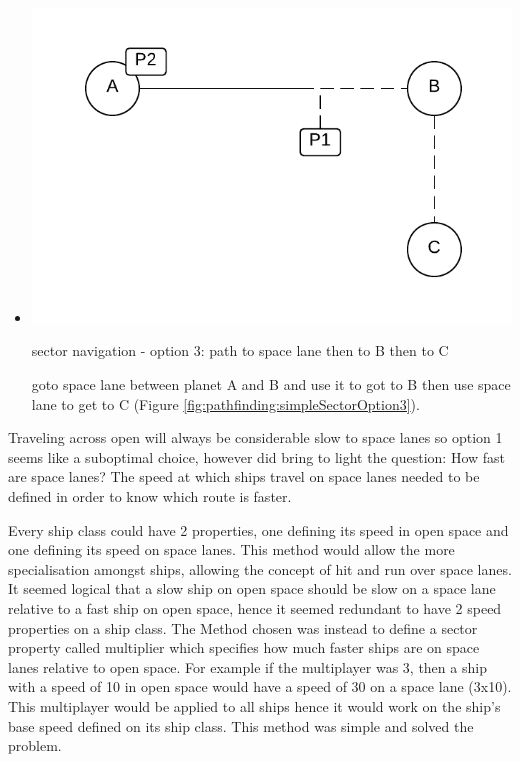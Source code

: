 \begin{itemize}
\item 
\begin{marginfigure}
	\includegraphics{res/pathfinding/PathFindingSectorOption3.pdf}
    \caption{sector navigation - option 3: path to space lane then to B then to C}
	\label{fig:pathfinding:simpleSectorOption3}
\end{marginfigure}
goto space lane between planet A and B and use it to got to B then use space lane to get to C (Figure \ref{fig:pathfinding:simpleSectorOption3}).

\end{itemize}


Traveling across open will always be considerable slow to space lanes so option 1 seems like a suboptimal choice, however did bring to light the question: How fast are space lanes?
The speed at which ships travel on space lanes needed to be defined in order to know which route is faster.

Every ship class could have 2 properties, one defining its speed in open space and one defining its speed on space lanes.
This method would allow the more specialisation amongst ships, allowing the concept of hit and run over space lanes. 
It seemed logical that a slow ship on open space should be slow on a space lane relative to a fast ship on open space, hence it seemed redundant to have 2 speed properties on a ship class.
The Method chosen was instead to define a sector property called multiplier which specifies how much faster ships are on space lanes relative to open space.
For example if the multiplayer was 3, then a ship with a speed of 10 in open space would have a speed of 30 on a space lane (3x10).
This multiplayer would be applied to all ships hence it would work on the ship's base speed defined on its ship class.
This method was simple and solved the problem.

